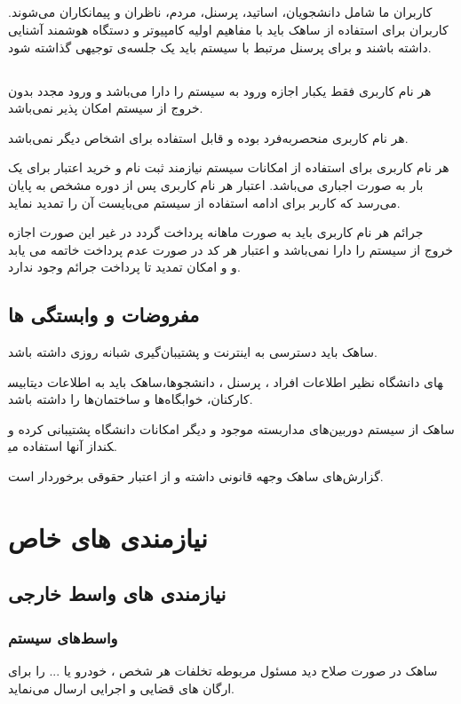 \documentclass[oneside,a4paper,12pt]{book}
\begin{document}
	
	\section{}
	کاربران ما شامل دانشجویان، اساتید، پرسنل، مردم، ناظران و پیمانکاران می‌شوند. کاربران برای استفاده از ساهک باید با مفاهیم اولیه کامپیوتر و دستگاه هوشمند آشنایی داشته باشند و برای پرسنل مرتبط با سیستم باید یک جلسه‌ی توجیهی گذاشته شود.
	\section{}
	\noindent
	هر نام کاربری فقط یکبار اجازه ورود به سیستم را دارا می‌باشد و ورود مجدد بدون خروج از سیستم امکان پذیر نمی‌باشد.
	
	\noindent
	هر نام کاربری منحصربه‌فرد بوده و قابل استفاده برای اشخاص دیگر نمی‌باشد.
	
	\noindent
	هر نام کاربری برای استفاده از امکانات سیستم نیازمند ثبت نام و خرید اعتبار برای یک بار به صورت اجباری می‌باشد. اعتبار هر نام کاربری پس از دوره مشخص به پایان می‌رسد که کاربر برای ادامه استفاده از سیستم می‌بایست آن را تمدید نماید.
	
	\noindent
	جرائم هر نام کاربری باید به صورت ماهانه پرداخت گردد در غیر این صورت اجازه خروج از سیستم را دارا نمی‌باشد و اعتبار هر کد در صورت عدم پرداخت خاتمه می یابد و و امکان تمدید تا پرداخت جرائم وجود ندارد.
	
	
	\section{مفروضات و وابستگی ها}
	\noindent
	ساهک باید دسترسی به اینترنت و پشتیبان‌گیری شبانه روزی داشته باشد.
	
	\noindent
	ساهک باید به اطلاعات دیتابیس‎های دانشگاه نظیر اطلاعات افراد ، پرسنل ، دانشجوها، کارکنان، خوابگاه‌ها و ساختمان‌ها را داشته باشد. 
	
	\noindent
	ساهک از سیستم دوربین‌های مداربسته موجود و دیگر امکانات دانشگاه پشتیبانی کرده و از آنها استفاده می‎کند.
	
	\noindent
	گزارش‌های ساهک وجهه قانونی داشته و از اعتبار حقوقی برخوردار است.
	
	
	\chapter{نیازمندی های خاص}
	\section{نیازمندی های واسط خارجی}
	\subsection{واسط‌های سیستم}
	\noindent
	ساهک در صورت صلاح دید مسئول مربوطه تخلفات هر شخص ، خودرو یا ... را برای ارگان های قضایی و اجرایی ارسال می‌نماید.
	
\end{document}
